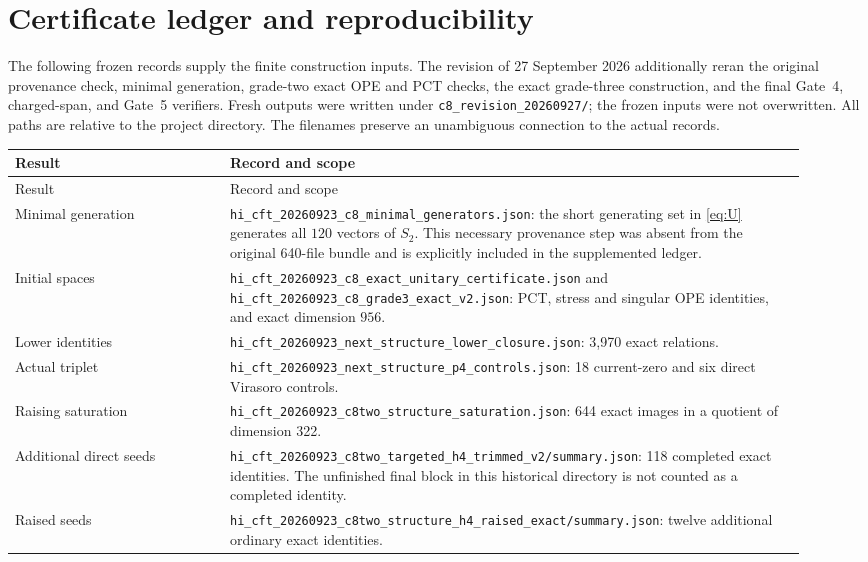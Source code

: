 \documentclass[11pt,a4paper]{article}
\theoremstyle{definition}
\newcommand{\artifact}[1]{\textnormal{\nolinkurl{#1}}}
\begin{document}
\appendix
\section{Certificate ledger and reproducibility}\label{sec:ledger}
The following frozen records supply the finite construction inputs.
The revision of 27 September 2026 additionally reran the original
provenance check, minimal generation, grade-two exact OPE and PCT
checks, the exact grade-three construction, and the final Gate~4,
charged-span, and Gate~5 verifiers. Fresh outputs were written under
\artifact{c8_revision_20260927/}; the frozen inputs were not overwritten.
All paths are relative to the project directory. The filenames preserve
an unambiguous connection to the actual records.

\begin{longtable}{@{}p{0.25\linewidth}p{0.67\linewidth}@{}}
\toprule
Result & Record and scope\\
\midrule\endfirsthead
\toprule Result & Record and scope\\\midrule\endhead
\bottomrule\endfoot
Minimal generation &
\artifact{hi_cft_20260923_c8_minimal_generators.json}:
the short generating set in \eqref{eq:U} generates all $120$ vectors
of $S_2$. This necessary provenance step was absent from the original
640-file bundle and is explicitly included in the supplemented ledger.\\
Initial spaces &
\artifact{hi_cft_20260923_c8_exact_unitary_certificate.json}
and \artifact{hi_cft_20260923_c8_grade3_exact_v2.json}:
PCT, stress and singular OPE identities, and exact dimension $956$.\\
Lower identities &
\artifact{hi_cft_20260923_next_structure_lower_closure.json}:
3,970 exact relations.\\
Actual triplet &
\artifact{hi_cft_20260923_next_structure_p4_controls.json}:
18 current-zero and six direct Virasoro controls.\\
Raising saturation &
\artifact{hi_cft_20260923_c8two_structure_saturation.json}:
644 exact images in a quotient of dimension 322.\\
Additional direct seeds &
\artifact{hi_cft_20260923_c8two_targeted_h4_trimmed_v2/summary.json}:
118 completed exact identities. The unfinished final block in this
historical directory is not counted as a completed identity.\\
Raised seeds &
\artifact{hi_cft_20260923_c8two_structure_h4_raised_exact/summary.json}:
twelve additional ordinary exact identities.\\

\end{longtable}
\end{document}
